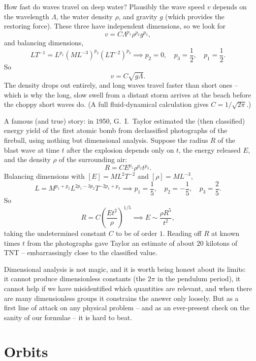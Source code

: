 \documentclass[a4paper]{scrartcl}
\begin{document}
\begin{example}
	How fast do waves travel on deep water? Plausibly the wave speed $v$ depends on the wavelength $\Lambda$, the water density $\rho$, and gravity $g$ (which provides the restoring force). These three have independent dimensions, so we look for
	$$
	v = C \Lambda^{p_1} \rho^{p_2} g^{p_3},
	$$
	and balancing dimensions,
	$$
	LT^{-1} = L^{p_1} (ML^{-3})^{p_2} (LT^{-2})^{p_3} \implies p_2 = 0, \quad p_3 = \frac{1}{2}, \quad p_1 = \frac{1}{2}.
	$$
	So
	$$
	v = C\sqrt{g \Lambda}.
	$$
	The density drops out entirely, and long waves travel faster than short ones -- which is why the long, slow swell from a distant storm arrives at the beach before the choppy short waves do. (A full fluid-dynamical calculation gives $C = 1/\sqrt{2\pi}$.)
\end{example}

\begin{example}
	A famous (and true) story: in 1950, G.\ I.\ Taylor estimated the (then classified) energy yield of the first atomic bomb from declassified photographs of the fireball, using nothing but dimensional analysis. Suppose the radius $R$ of the blast wave at time $t$ after the explosion depends only on $t$, the energy released $E$, and the density $\rho$ of the surrounding air:
	$$
	R = C E^{p_1} \rho^{p_2} t^{p_3}.
	$$
	Balancing dimensions with $[E] = ML^2T^{-2}$ and $[\rho] = ML^{-3}$,
	$$
	L = M^{p_1 + p_2} L^{2p_1 - 3p_2} T^{-2p_1 + p_3} \implies p_1 = \frac{1}{5}, \quad p_2 = -\frac{1}{5}, \quad p_3 = \frac{2}{5}.
	$$
	So
	$$
	R = C\left(\frac{E t^2}{\rho}\right)^{1/5} \implies E \sim \frac{\rho R^5}{t^2},
	$$
	taking the undetermined constant $C$ to be of order $1$. Reading off $R$ at known times $t$ from the photographs gave Taylor an estimate of about $20$ kilotons of TNT -- embarrassingly close to the classified value.
\end{example}

Dimensional analysis is not magic, and it is worth being honest about its limits: it cannot produce dimensionless constants (the $2\pi$ in the pendulum period), it cannot help if we have misidentified which quantities are relevant, and when there are many dimensionless groups it constrains the answer only loosely. But as a first line of attack on any physical problem -- and as an ever-present check on the sanity of our formulae -- it is hard to beat.




\section{Orbits}
\end{document}
